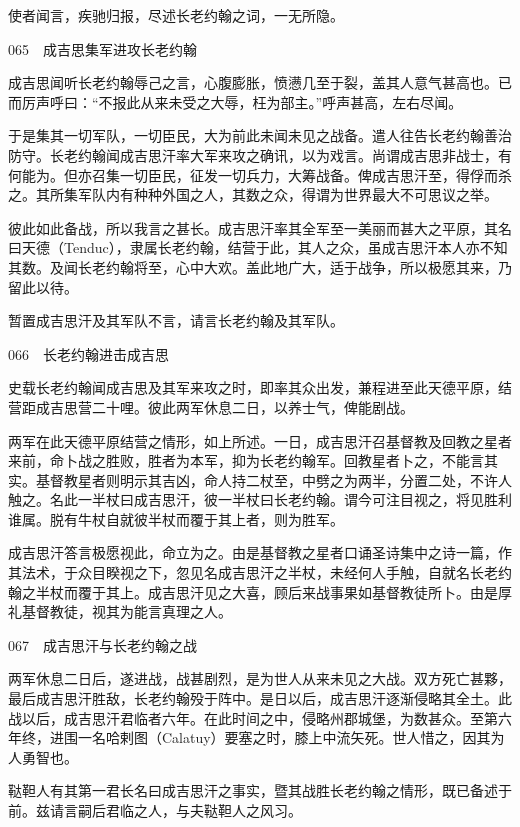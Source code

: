 \documentclass[12pt,UTF8]{ctexbook}
\begin{document}
使者闻言，疾驰归报，尽述长老约翰之词，一无所隐。





065　成吉思集军进攻长老约翰

成吉思闻听长老约翰辱己之言，心腹膨胀，愤懑几至于裂，盖其人意气甚高也。已而厉声呼曰：“不报此从来未受之大辱，枉为部主。”呼声甚高，左右尽闻。

于是集其一切军队，一切臣民，大为前此未闻未见之战备。遣人往告长老约翰善治防守。长老约翰闻成吉思汗率大军来攻之确讯，以为戏言。尚谓成吉思非战士，有何能为。但亦召集一切臣民，征发一切兵力，大筹战备。俾成吉思汗至，得俘而杀之。其所集军队内有种种外国之人，其数之众，得谓为世界最大不可思议之举。

彼此如此备战，所以我言之甚长。成吉思汗率其全军至一美丽而甚大之平原，其名曰天德（Tenduc），隶属长老约翰，结营于此，其人之众，虽成吉思汗本人亦不知其数。及闻长老约翰将至，心中大欢。盖此地广大，适于战争，所以极愿其来，乃留此以待。

暂置成吉思汗及其军队不言，请言长老约翰及其军队。





066　长老约翰进击成吉思

史载长老约翰闻成吉思及其军来攻之时，即率其众出发，兼程进至此天德平原，结营距成吉思营二十哩。彼此两军休息二日，以养士气，俾能剧战。

两军在此天德平原结营之情形，如上所述。一日，成吉思汗召基督教及回教之星者来前，命卜战之胜败，胜者为本军，抑为长老约翰军。回教星者卜之，不能言其实。基督教星者则明示其吉凶，命人持二杖至，中劈之为两半，分置二处，不许人触之。名此一半杖曰成吉思汗，彼一半杖曰长老约翰。谓今可注目视之，将见胜利谁属。脱有牛杖自就彼半杖而覆于其上者，则为胜军。

成吉思汗答言极愿视此，命立为之。由是基督教之星者口诵圣诗集中之诗一篇，作其法术，于众目睽视之下，忽见名成吉思汗之半杖，未经何人手触，自就名长老约翰之半杖而覆于其上。成吉思汗见之大喜，顾后来战事果如基督教徒所卜。由是厚礼基督教徒，视其为能言真理之人。





067　成吉思汗与长老约翰之战

两军休息二日后，遂进战，战甚剧烈，是为世人从来未见之大战。双方死亡甚夥，最后成吉思汗胜敌，长老约翰殁于阵中。是日以后，成吉思汗逐渐侵略其全土。此战以后，成吉思汗君临者六年。在此时间之中，侵略州郡城堡，为数甚众。至第六年终，进围一名哈剌图（Calatuy）要塞之时，膝上中流矢死。世人惜之，因其为人勇智也。

鞑靼人有其第一君长名曰成吉思汗之事实，暨其战胜长老约翰之情形，既已备述于前。兹请言嗣后君临之人，与夫鞑靼人之风习。
\end{document}
